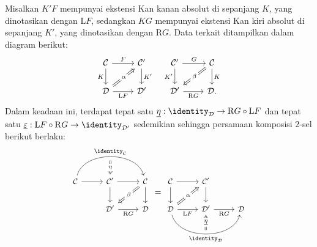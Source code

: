 \begin{teorema}\label{prop:Quillen-adjunction-gen}
	Misalkan $K'F$ mempunyai ekstensi Kan kanan absolut di sepanjang $K$,
	yang dinotasikan dengan $\mathrm{L}F$, sedangkan $KG$ mempunyai ekstensi
	Kan kiri absolut di sepanjang $K'$, yang dinotasikan dengan $\mathrm{R}G$.
	Data terkait ditampilkan dalam diagram berikut:
	\[\begin{tikzcd}
		\mathcal{C} \arrow[r, "F"] \arrow[d, "K"'] & \mathcal{C}' \arrow[d, "{K'}"] \\
		\mathcal{D} \arrow[r, "{\mathrm{L}F}"'] \arrow[Rightarrow, ru, "\alpha" description] & \mathcal{D}'
	\end{tikzcd} \quad \begin{tikzcd}
		\mathcal{C}' \arrow[r, "G"] \arrow[d, "{K'}"'] & \mathcal{C} \arrow[d, "K"] \arrow[Rightarrow, ld, "\beta" description] \\
		\mathcal{D}' \arrow[r, "{\mathrm{R}G}"'] & \mathcal{D} .
	\end{tikzcd} \]
	Dalam keadaan ini, terdapat tepat satu
	$\underline{\eta}: \identity_{\mathcal{D}} \to \mathrm{R}G \circ \mathrm{L}F$
	dan tepat satu
	$\underline{\varepsilon}: \mathrm{L}F \circ \mathrm{R}G \to
	\identity_{\mathcal{D}'}$ sedemikian sehingga persamaan komposisi $2$-sel
	berikut berlaku:
	\begin{equation*}\begin{gathered}
		\begin{tikzcd}[every cell/.append style = {font = \small}]
			\mathcal{C} \arrow[r] \arrow[rr, bend left=75, "{\identity_{\mathcal{C}}}", ""' {name=I}] & \mathcal{C}' \arrow[r] \arrow[d] \arrow[Rightarrow, from=I, "\eta" description] & \mathcal{C} \arrow[d] \arrow[Rightarrow, ld, "\beta" description] \\
			& \mathcal{D}' \arrow[r, "{\mathrm{R}G}"'] & \mathcal{D}
		\end{tikzcd} = \begin{tikzcd}[every cell/.append style = {font = \small}]
			\mathcal{C} \arrow[r] \arrow[d] & \mathcal{C}' \arrow[d] & \\
			\mathcal{D} \arrow[r, "{\mathrm{L}F}"'] \arrow[rr, bend right=75, "{\identity_{\mathcal{D}}}"', "" {name=I}] \arrow[Rightarrow, ru, "\alpha" description] & \mathcal{D}' \arrow[r, "{\mathrm{R}G}"'] \arrow[Rightarrow, from=I, "\underline{\eta}" description] & \mathcal{D}

\end{tikzcd}
\end{gathered}
\end{equation*}
\end{teorema}
